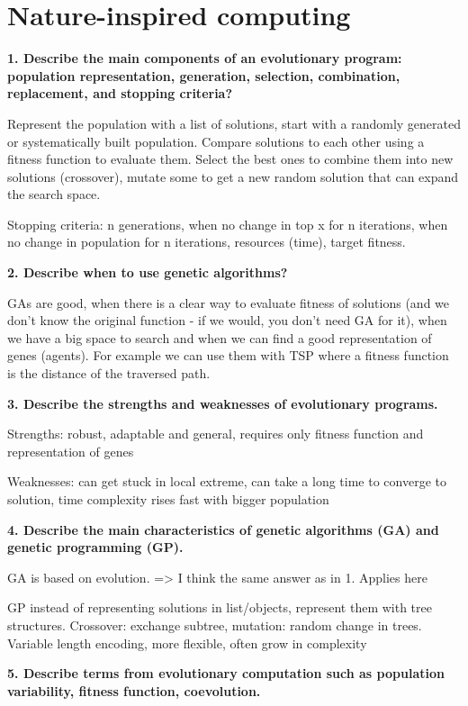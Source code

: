 \section{Nature-inspired computing}

\textbf{1. Describe the main components of an evolutionary program:
population representation, generation, selection, combination,
replacement, and stopping criteria?}

Represent the population with a list of solutions, start with a randomly
generated or systematically built population. Compare solutions to each
other using a fitness function to evaluate them. Select the best ones to
combine them into new solutions (crossover), mutate some to get a new
random solution that can expand the search space.

Stopping criteria: n generations, when no change in top x for n
iterations, when no change in population for n iterations, resources
(time), target fitness.


\textbf{2. Describe when to use genetic algorithms?}

GAs are good, when there is a clear way to evaluate fitness of solutions
(and we don't know the original function - if we would, you don't need
GA for it), when we have a big space to search and when we can find a
good representation of genes (agents). For example we can use them with
TSP where a fitness function is the distance of the traversed path.

\textbf{3. Describe the strengths and weaknesses of evolutionary
programs.}

Strengths: robust, adaptable and general, requires only fitness function
and representation of genes

Weaknesses: can get stuck in local extreme, can take a long time to
converge to solution, time complexity rises fast with bigger population

\textbf{4. Describe the main characteristics of genetic algorithms (GA)
and genetic programming (GP).}

GA is based on evolution. =\textgreater{} I think the same answer as in
1. Applies here

GP instead of representing solutions in list/objects, represent them
with tree structures. Crossover: exchange subtree, mutation: random
change in trees. Variable length encoding, more flexible, often grow in
complexity

\textbf{5. Describe terms from evolutionary computation such as
population variability, fitness function, coevolution.}

